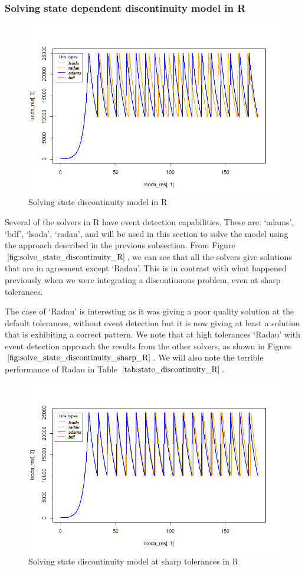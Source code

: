 \subsubsection{Solving state dependent discontinuity model in R}
\begin{figure}[h]
\centering
\includegraphics[width=0.7\linewidth]{./figures/solve_state_discontinuity_R}
\caption{Solving state discontinuity model in R}
\label{fig:solve_state_discontinuity_R}
\end{figure}
Several of the solvers in R have event detection capabilities. These are: `adams', `bdf', `lsoda', `radau', and will be used in this section to solve the model using the approach described in the previous subsection. From Figure $\ref{fig:solve_state_discontinuity_R}$, we can see that all the solvers give solutions that are in agreement except `Radau'. This is in contrast with what happened previously when we were integrating a discontinuous problem, even at sharp tolerances. 

The case of `Radau' is interesting as it was giving a poor quality solution at the default tolerances, without event detection but it is now giving at least a solution that is exhibiting a correct pattern. We note that at high tolerances `Radau' with event detection approach the results from the other solvers, as shown in Figure $\ref{fig:solve_state_discontinuity_sharp_R}$. We will also note the terrible performance of Radau in Table $\ref{tab:state_discontinuity_R}$.

\begin{figure}[h]
\centering
\includegraphics[width=0.7\linewidth]{./figures/solve_state_discontinuity_sharp_R}
\caption{Solving state discontinuity model at sharp tolerances in R}
\label{fig:solve_state_discontinuity_sharp_R}
\end{figure}


